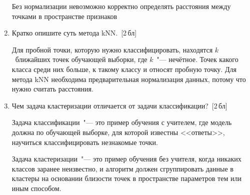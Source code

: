\documentclass[a4paper,10pt]{article}
\begin{document}
\begin{enumerate}
	Без нормализации невозможно корректно определять расстояния между точками в пространстве признаков

	\item Кратко опишите суть метода kNN.~[2\,бл]
	
	Для пробной точки, которую нужно классифицировать, находятся $k$~ближайших точек обучающей выборки, где $k$~"--- нечётное. Точек какого класса среди них больше, к такому классу и относят пробную точку. Для метода kNN необходима предварительная нормализация данных, потому что нужно считать расстояния.
	
	\item Чем задача кластеризации отличается от задачи классификации?~[2\,бл]
	
	Задача классификации~"--- это пример обучения с учителем, где модель должна по обучающей выборке, для которой известны <<ответы>>, научиться классифицировать незнакомые точки.
	
	Задача кластеризации~"--- это пример обучения без учителя, когда никаких классов заранее неизвестно, и алгоритм должен сгруппировать данные в кластеры на основании близости точек в пространстве параметров тем или иным способом.
	
\end{enumerate}
\end{document}
